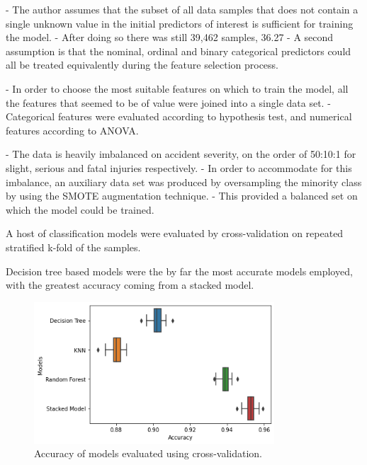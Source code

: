\documentclass[12pt]{article}
\begin{document}

- The author assumes that the subset of all data samples that does not contain a single unknown value in the initial predictors of interest is sufficient for training the model.
- After doing so there was still 39,462 samples, 36.27%
- A second assumption is that the nominal, ordinal and binary categorical predictors could all be treated equivalently during the feature selection process.


- In order to choose the most suitable features on which to train the model, all the features that seemed to be of value were joined into a single data set.
- Categorical features were evaluated according to hypothesis test, and numerical features according to ANOVA.



- The data is heavily imbalanced on accident severity, on the order of 50:10:1 for slight, serious and fatal injuries respectively.
- In order to accommodate for this imbalance, an auxiliary data set was produced by oversampling the minority class by using the SMOTE augmentation technique.
- This provided a balanced set on which the model could be trained.


A host of classification models were evaluated by cross-validation on repeated stratified k-fold of the samples. 

Decision tree based models were the by far the most accurate models employed, with the greatest accuracy coming from a stacked model.

\begin{figure}[h]
\centering     %
\includegraphics[width=0.80\textwidth]{model_plot}
\caption{Accuracy of models evaluated using cross-validation.}
\end{figure}
\end{document}
